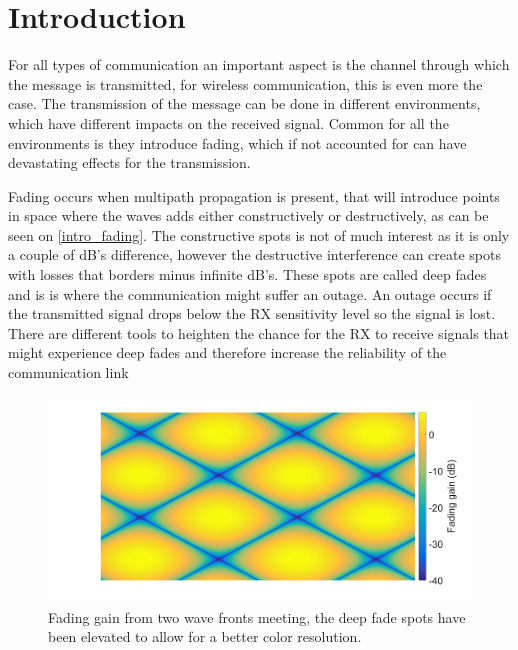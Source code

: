 \chapter{Introduction}

%

For all types of communication an important aspect is the channel through which the message is transmitted, for wireless communication, this is even more the case. The transmission of the message can be done in different environments, which have different impacts on the received signal. Common for all the environments is they introduce fading, which if not accounted for can have devastating effects for the transmission. 

Fading occurs when multipath propagation is present, that will introduce points in space where the waves adds either constructively or destructively, as can be seen on \autoref{intro_fading}. The constructive spots is not of much interest as it is only a couple of dB's difference, however the destructive interference can create spots with losses that borders minus infinite dB's. These spots are called deep fades and is is where the communication might suffer an outage. An outage occurs if the transmitted signal drops below the RX sensitivity level so the signal is lost. There are different tools to heighten the chance for the RX to receive signals that might experience deep fades and therefore increase the reliability of the communication link


\begin{figure}[H]
\centering
\includegraphics[width=\textwidth]{figures/intro_fading.png}
\caption{Fading gain from two wave fronts meeting, the deep fade spots have been elevated to allow for a better color resolution.}
\label{intro_fading}
\end{figure}

